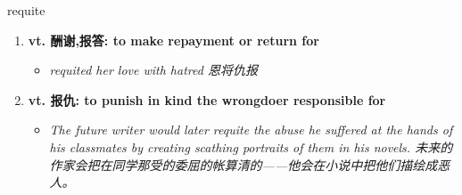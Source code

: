 
\begin{frame}
{\huge requite}
\begin{center}
\begin{enumerate}\Large
  \item \textbf{vt. 酬谢,报答: to make repayment or return for}
  \begin{itemize}
    \item \em{\Large{requited her love with hatred 恩将仇报}}
  \end{itemize}
  \item \textbf{vt. 报仇: to punish in kind the wrongdoer responsible for}
  \begin{itemize}
    \item \em{\Large{The future writer would later requite the abuse he suffered at the hands of his classmates by creating scathing portraits of them in his novels. 未来的作家会把在同学那受的委屈的帐算清的——他会在小说中把他们描绘成恶人。}}
  \end{itemize}
\end{enumerate}
\end{center}
\end{frame}
